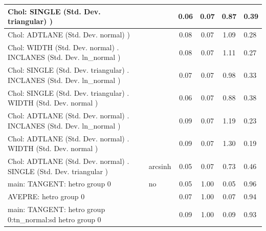 \begin{table}
\begin{center}
\begin{tabular}{|l|l|c|c|c|l|}
			\hline
			 Chol: SINGLE (Std. Dev. triangular) ) &  & 0.06 & 0.07 & 0.87 & 0.39 \\
			\hline
			 Chol: ADTLANE (Std. Dev. normal) ) &  & 0.08 & 0.07 & 1.09 & 0.28 \\
			\hline
			 Chol: WIDTH (Std. Dev. normal) . INCLANES (Std. Dev.   ln_normal ) &  & 0.08 & 0.07 & 1.11 & 0.27 \\
			\hline
			 Chol: SINGLE (Std. Dev. triangular) . INCLANES (Std. Dev.   ln_normal ) &  & 0.07 & 0.07 & 0.98 & 0.33 \\
			\hline
			 Chol: SINGLE (Std. Dev. triangular) . WIDTH (Std. Dev.   normal ) &  & 0.06 & 0.07 & 0.88 & 0.38 \\
			\hline
			 Chol: ADTLANE (Std. Dev. normal) . INCLANES (Std. Dev.   ln_normal ) &  & 0.09 & 0.07 & 1.19 & 0.23 \\
			\hline
			 Chol: ADTLANE (Std. Dev. normal) . WIDTH (Std. Dev.   normal ) &  & 0.09 & 0.07 & 1.30 & 0.19 \\
			\hline
			 Chol: ADTLANE (Std. Dev. normal) . SINGLE (Std. Dev.   triangular ) & arcsinh & 0.05 & 0.07 & 0.73 & 0.46 \\
			\hline
			main: TANGENT: hetro group 0 & no & 0.05 & 1.00 & 0.05 & 0.96 \\
			\hline
			AVEPRE: hetro group 0 &  & 0.07 & 1.00 & 0.07 & 0.94 \\
			\hline
			main: TANGENT: hetro group 0:tn_normal:sd  hetro group 0 &  & 0.09 & 1.00 & 0.09 & 0.93 \\
			\hline
		\end{tabular}
	\end{center}
\end{table}